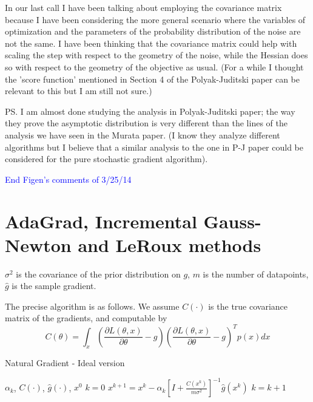 \documentclass[12pt]{article}
\begin{document}
In our last call I have been talking about employing the covariance matrix because I have been considering the more general scenario where the variables of optimization and the parameters of the probability distribution of the noise are not the same.  I have been thinking that the covariance matrix could help with scaling the step with respect to the geometry of the noise, while the Hessian does so with respect to the geometry of the objective as usual.  (For a while I thought the 'score function' mentioned in Section 4 of the Polyak-Juditski paper can be relevant to this but I am still not sure.)


PS. I am almost done studying the analysis in Polyak-Juditski paper; the way they prove the asymptotic distribution is very different than the lines of the analysis we have seen in the Murata paper.  (I know they analyze different algorithms but I believe that a similar analysis to the one in P-J paper could be considered for the pure stochastic gradient algorithm).

\textcolor{blue}{End Figen's comments of 3/25/14}

\section{AdaGrad, Incremental Gauss-Newton and LeRoux methods}
\label{ada}

 
$\sigma^2$ is the covariance of the prior distribution on $g$, $m$ is the number of datapoints, $\hat{g}$ is the sample gradient. 

The precise algorithm is as follows. We assume $C(\cdot)$ is the true covariance matrix of the gradients, and computable by 
\begin{equation}
	C(\theta) = \int_x \left( \frac{\partial L(\theta,x)}{\partial \theta}-g\right) \left(\frac{\partial L(\theta,x)}{\partial \theta}-g \right)^T p(x) dx
\end{equation}

\begin{algorithm}[H]
\caption{Natural Gradient - Ideal version}
\label{alg1}
\begin{algorithmic}[1]
\REQUIRE  $\alpha_k$, $C(\cdot)$, $\hat{g}(\cdot)$, $x^0$
\STATE  $k=0$
\STATE $x^{k+1} = x^k - \alpha_k \left[ I +  \frac{C(x^k)}{m \sigma^2}\right]^{-1} \hat{g}(x^k)$
\STATE $k=k+1$
\ENDWHILE
\end{algorithmic}
\end{algorithm}
\end{document}
